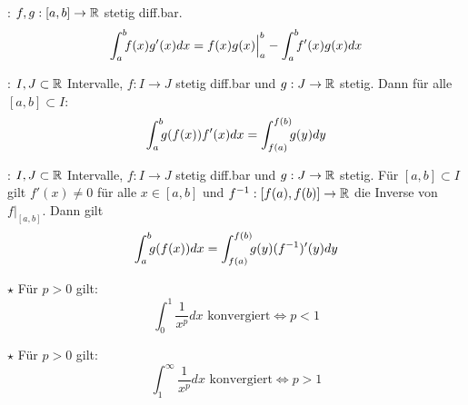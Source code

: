 \Satz {}: $f,g: [a, b] \to \mathbb{R}$ stetig diff.bar.
$$\int_a^b \hspace{-4pt} f(x)g'(x) dx = f(x)g(x) \Big|_a^b - \int_a^b \hspace{-4pt} f'(x)g(x) dx$$

\Satz {}: $I, J \subset \mathbb{R}$ Intervalle, $f: I \to J$ stetig diff.bar und
$g: J \to \mathbb{R}$ stetig. Dann für alle $[a, b] \subset I$:
$$\int_a^b \hspace{-4pt} g(f(x))f'(x) dx = \int_{f(a)}^{f(b)} \hspace{-4pt} g(y) dy$$

\Satz {}: $I, J \subset \mathbb{R}$ Intervalle, $f: I \to J$ stetig diff.bar
und $g: J \to \mathbb{R}$ stetig. Für $[a, b] \subset I$ gilt $f'(x) \ne 0$ für alle $x \in [a, b]$
und $f^{-1}: [f(a), f(b)] \to \mathbb{R}$ die Inverse von $f\Big|_{[a,b]}$. Dann gilt
$$\int_a^b \hspace{-4pt} g(f(x)) dx = \int_{f(a)}^{f(b)} \hspace{-4pt} g(y)(f^{-1})'(y)dy$$

\Satz $\star$ Für $p > 0$ gilt:
$$\int_{0}^{1} \frac{1}{x^p} dx \text{ konvergiert} \iff p < 1$$

\Satz $\star$ Für $p > 0$ gilt:
$$\int_{1}^{\infty} \frac{1}{x^p} dx \text{ konvergiert} \iff p > 1$$

